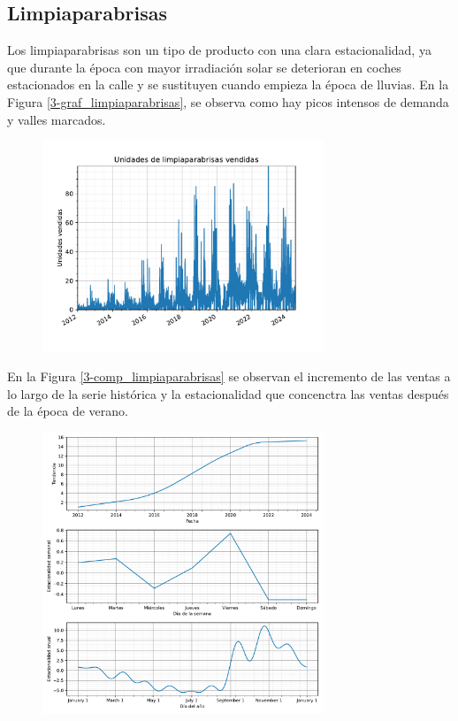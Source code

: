 \subsection{Limpiaparabrisas}

Los limpiaparabrisas son un tipo de producto con una clara estacionalidad, ya que durante la época con mayor irradiación solar se deterioran en coches estacionados en la calle y se sustituyen cuando empieza la época de lluvias. En la Figura \ref*{3-graf_limpiaparabrisas}, se observa como hay picos intensos de demanda y valles marcados.

\begin{figure}[H]
	{\includegraphics[width=0.75\textwidth]{imagenes/grafica_limpiaparabrisas.pdf}}
\end{figure}

En la Figura \ref*{3-comp_limpiaparabrisas} se observan el incremento de las ventas a lo largo de la serie histórica y la estacionalidad que concenctra las ventas después de la época de verano.

\begin{figure}[H]
	{\includegraphics[width=0.75\textwidth]{imagenes/comps_limpiaparabrisas.pdf}}
\end{figure}